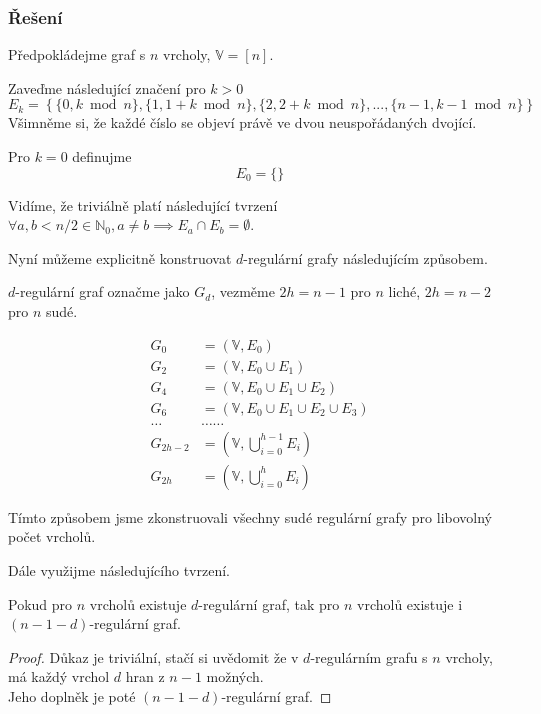 \documentclass[../main.tex]{subfiles}
\begin{document}
\subsubsection*{Řešení}
Předpokládejme graf s $n$ vrcholy, $\mathbb{V} = [n]$.

Zaveďme následující značení pro $k>0$
\begin{equation*}
    E_k = \left\{ \{ 0, k\bmod n \}, \{ 1, 1 + k\bmod n \}, \{ 2, 2+k\bmod n \}, ..., \{ n - 1, k - 1\bmod n \}\right\}
\end{equation*}
Všimněme si, že každé číslo se objeví právě ve dvou neuspořádaných dvojící.

Pro $k=0$ definujme
\begin{equation*}
    E_0 = \{\}
\end{equation*}

Vidíme, že triviálně platí následující tvrzení $\forall a,b <n/2 \in \mathbb{N}_0, a\neq b \implies E_a \cap E_b = \emptyset$.



Nyní můžeme explicitně konstruovat $d$-regulární grafy následujícím způsobem. 

$d$-regulární graf označme jako $G_d$, vezměme $2h=n-1$ pro $n$ liché, $2h=n-2$ pro $n$ sudé. 

\begin{align*}
    G_0 &= (\mathbb{V}, E_0 )\\
    G_2 &= (\mathbb{V}, E_0 \cup E_1)\\
    G_4 &= (\mathbb{V}, E_0 \cup E_1 \cup E_2)\\
    G_6 &= (\mathbb{V}, E_0 \cup E_1 \cup E_2 \cup E_3)\\
    \dots&\dots\dots\\
    G_{2h-2} &= (\mathbb{V}, \bigcup_{i=0}^{h-1} E_i)\\
    G_{2h} &= (\mathbb{V}, \bigcup_{i=0}^{h} E_i)
\end{align*}


Tímto způsobem jsme zkonstruovali všechny sudé regulární grafy pro libovolný počet vrcholů.


Dále využijme následujícího tvrzení.
\begin{lemma*}
    Pokud pro $n$ vrcholů existuje $d$-regulární graf, tak pro $n$ vrcholů existuje i $(n-1-d)$-regulární graf.    
\end{lemma*}
\begin{proof}
    Důkaz je triviální, stačí si uvědomit že v $d$-regulárním grafu s $n$ vrcholy, má každý vrchol $d$ hran z $n-1$ možných. \\
    Jeho doplněk je poté $(n-1-d)$-regulární graf. 
\end{proof}
\end{document}
